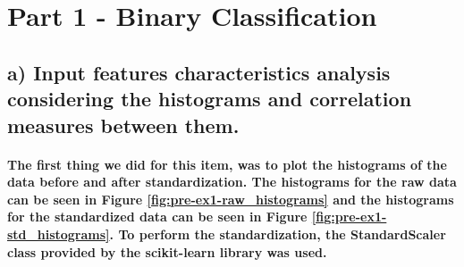 \documentclass[a4paper]{article}    %
\begin{document}
\section{Part 1 - Binary Classification}

\subsection{a) Input features characteristics analysis considering the histograms and correlation measures between them.}

\paragraph{The first thing we did for this item, was to plot the histograms of the data before and after standardization. The histograms for the raw data can be seen in Figure \ref{fig:pre-ex1-raw_histograms} and the histograms for the standardized data can be seen in Figure \ref{fig:pre-ex1-std_histograms}. To perform the standardization, the StandardScaler class provided by the scikit-learn library was used.}

\end{document}
